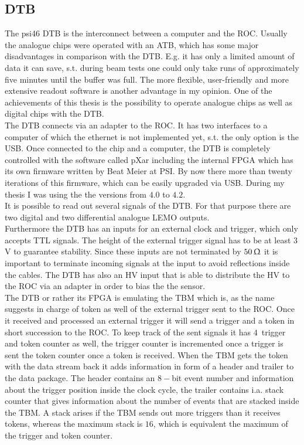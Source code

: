 \subsection{\ac{DTB}}\label{sdtb}
The psi46 \ac{DTB} is the interconnect between a computer and the \ac{ROC}. Usually the analogue chips were operated with an \ac{ATB}, which has some major disadvantages in comparison with the \ac{DTB}. E.g. it has only a limited amount of data it can save, s.t. during beam tests one could only take runs of approximately five minutes until the buffer was full. The more flexible, user-friendly and more extensive readout software is another advantage in my opinion. One of the achievements of this thesis is the possibility to operate analogue chips as well as digital chips with the \ac{DTB}.\\
The \ac{DTB} connects via an adapter to the \ac{ROC}. It has two interfaces to a computer of which the ethernet is not implemented yet, s.t. the only option is the USB. Once connected to the chip and a computer, the \ac{DTB} is completely controlled with the software called pXar including the internal \ac{FPGA} which has its own firmware written by Beat Meier at \ac{PSI}. By now there more than twenty iterations of this firmware, which can be easily upgraded via USB. During my thesis I was using the the versions from $4.0$ to $4.2$.\\
It is possible to read out several signals of the \ac{DTB}. For that purpose there are two digital and two differential analogue LEMO outputs.\\
Furthermore the \ac{DTB} has an inputs for an external clock and trigger, which only accepts \ac{TTL} signals. The height of the external trigger signal has to be at least $3\,$V to guarantee stability. Since these inputs are not terminated by $50\,\Upomega$ it is important to terminate incoming signals at the input to avoid reflections inside the cables. The \ac{DTB} has also an \ac{HV} input that is able to distribute the \ac{HV} to the \ac{ROC} via an adapter in order to bias the the sensor.\\
The \ac{DTB} or rather its \ac{FPGA} is emulating the \ac{TBM} which is, as the name suggests in charge of token as well of the external trigger sent to the \ac{ROC}. Once it received and processed an external trigger it will send a trigger and a token in short succession to the \ac{ROC}. To keep track of the sent signals it has $4\,$ trigger and token counter as well, the trigger counter is incremented once a trigger is sent the token counter once a token is received. When the \ac{TBM} gets the token with the data stream back it adds information in form of a header and trailer to the data package. The header contains an $8-$bit event number and information about the trigger position inside the clock cycle, the trailer contains i.a. stack counter that gives information about the number of events that are stacked inside the \ac{TBM}. A stack arises if the \ac{TBM} sends out more triggers than it receives tokens, whereas the maximum stack is $16$, which is equivalent the maximum of the trigger and token counter.\\
